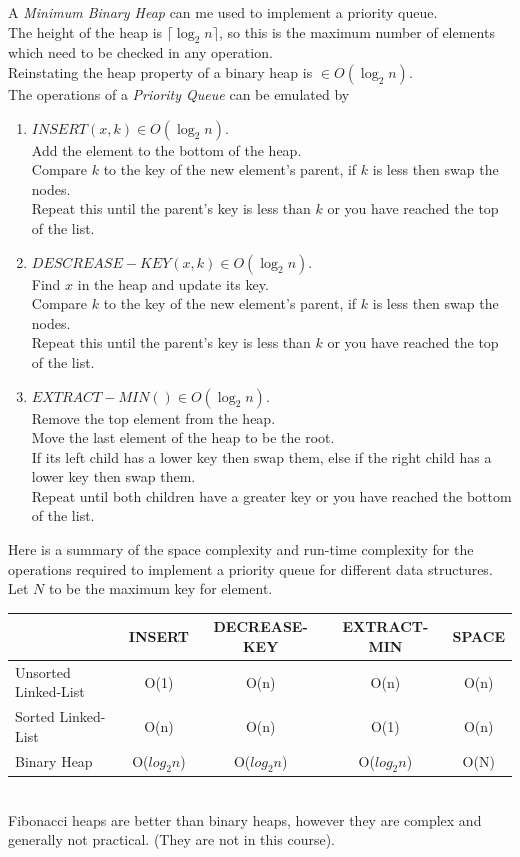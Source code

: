 \documentclass[11pt,a4paper]{article}
\begin{document}
A \textit{Minimum Binary Heap} can me used to implement a priority queue.\\
The height of the heap is $\lceil\log_2n\rceil$, so this is the maximum number of elements which need to be checked in any operation.\\
Reinstating the heap property of a binary heap is $\in O(\log_2n)$.\\
The operations of a \textit{Priority Queue} can be emulated by
\begin{enumerate}[label=\roman*)]
  \item $INSERT(x,k)\in O(\log_2n)$.\\
  Add the element to the bottom of the heap.\\
  Compare $k$ to the key of the new element's parent, if $k$ is less then swap the nodes.\\
  Repeat this until the parent's key is less than $k$ or you have reached the top of the list.
  \item $DESCREASE-KEY(x,k) \in O(\log_2n)$.\\
  Find $x$ in the heap and update its key.\\
  Compare $k$ to the key of the new element's parent, if $k$ is less then swap the nodes.\\
  Repeat this until the parent's key is less than $k$ or you have reached the top of the list.
  \item $EXTRACT-MIN()\in O(\log_2n)$.\\
  Remove the top element from the heap.\\
  Move the last element of the heap to be the root.\\
  If its left child has a lower key then swap them, else if the right child has a lower key then swap them.\\
  Repeat until both children have a greater key or you have reached the bottom of the list.
\end{enumerate}

Here is a summary of the space complexity and run-time complexity for the operations required to implement a priority queue for different data structures.\\
Let $N$ to be the maximum key for element.\\
\begin{tabular}{|l|c|c|c|c|}
\hline
&INSERT&DECREASE-KEY&EXTRACT-MIN&SPACE\\
\hline
Unsorted Linked-List&O(1)&O(n)&O(n)&O(n)\\
Sorted Linked-List&O(n)&O(n)&O(1)&O(n)\\
Binary Heap&O($log_2n$)&O($log_2n$)&O($log_2n$)&O(N)\\
\hline
\end{tabular}\\
\nb Fibonacci heaps are better than binary heaps, however they are complex and generally not practical. (They are not in this course).
\end{document}
